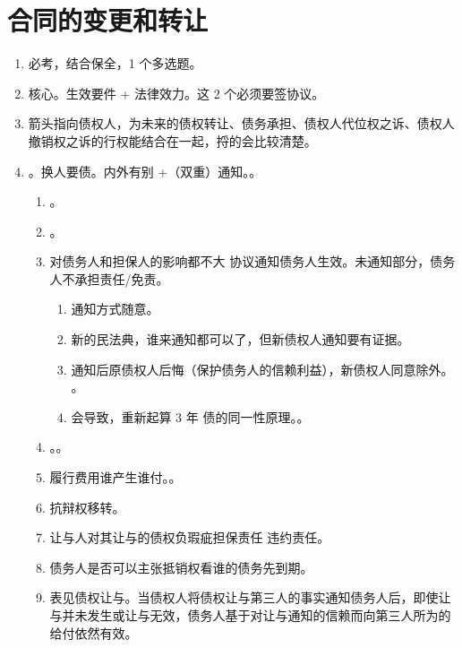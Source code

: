 \section{合同的变更和转让}
\begin{enumerate}
  \item 必考，结合保全，1 个多选题。
  \item 核心。生效要件 + 法律效力。这 2 个必须要签协议。
  \item 箭头指向债权人，为未来的债权转让、债务承担、债权人代位权之诉、债权人撤销权之诉的行权能结合在一起，捋的会比较清楚。
  \item {}。换人要债。内外有别 +（双重）通知。。
        \begin{enumerate}
          \item {}。
          \item {}。
          \item 对债务人和担保人的影响都不大 \yjt 协议通知债务人生效。未通知部分，债务人不承担责任/免责。
                \begin{enumerate}
                  \item 通知方式随意。
                  \item 新的民法典，谁来通知都可以了，但新债权人通知要有证据。
                  \item 通知后原债权人后悔（保护债务人的信赖利益），新债权人同意除外。
                        。
                  \item 会导致，重新起算 3 年 \yjt 债的同一性原理。。
                \end{enumerate}
          \item {}。。
          \item 履行费用谁产生谁付。。
          \item 抗辩权移转。
          \item 让与人对其让与的债权负瑕疵担保责任 \yjt 违约责任。
          \item 债务人是否可以主张抵销权看谁的债务先到期。
          \item 表见债权让与。当债权人将债权让与第三人的事实通知债务人后，即使让与并未发生或让与无效，债务人基于对让与通知的信赖而向第三人所为的给付依然有效。

\end{enumerate}
\end{enumerate}
